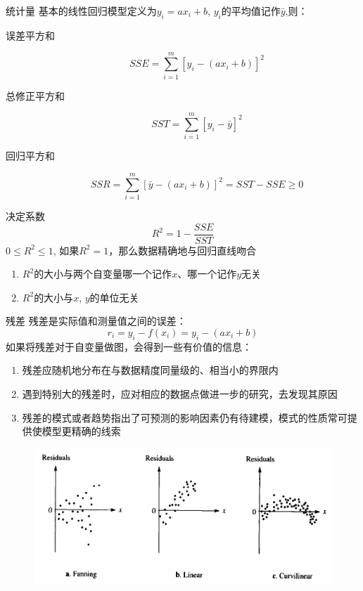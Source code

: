 \documentclass[UTF8]{ctexbeamer}
\begin{document}
\begin{frame}{统计量}
  基本的线性回归模型定义为$y_i = ax_i + b$, $y_i$的平均值记作$\bar{y}$,则：

  \begin{description}
  \item[误差平方和] 
    \[
    SSE = \sum_{i=1}^m [y_i - (ax_i + b)]^2
    \]
  \item[总修正平方和] 
    \[
    SST = \sum_{i=1}^m [y_i - \bar{y}]^2
    \]
  \item[回归平方和] 
    \[
    SSR = \sum_{i=1}^m [\bar{y} - (ax_i + b)]^2 = SST - SSE \ge 0
    \]
  \end{description}
  
\end{frame}

\begin{frame}{决定系数}
  \[
  R^2 = 1 - \frac{SSE}{SST}
  \]
  $0 \le R^2 \le 1$, 如果$R^2 = 1$，那么数据精确地与回归直线吻合

  \begin{enumerate}
  \item $R^2$的大小与两个自变量哪一个记作$x$、哪一个记作$y$无关
  \item $R^2$的大小与$x$, $y$的单位无关
  \end{enumerate}

\end{frame}

\begin{frame}{残差}
  残差是实际值和测量值之间的误差：
  \[
  r_i = y_i - f(x_i) = y_i - (ax_i + b)
  \]
  如果将残差对于自变量做图，会得到一些有价值的信息：
  \begin{enumerate}
  \item 残差应随机地分布在与数据精度同量级的、相当小的界限内
  \item 遇到特别大的残差时，应对相应的数据点做进一步的研究，去发现其原因
  \item 残差的模式或者趋势指出了可预测的影响因素仍有待建模，模式的性质常可提供使模型更精确的线索
  \end{enumerate}

  \begin{figure}
    \centering
    \includegraphics[width=.4\textwidth{}]{error.png}
  \end{figure}

\end{frame}
\end{document}
